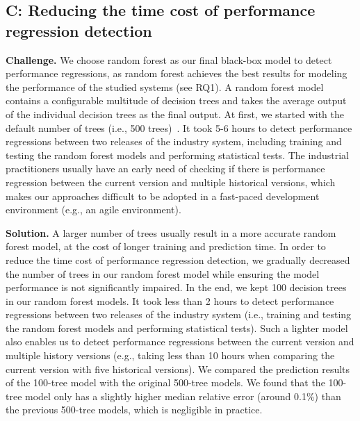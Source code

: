 \subsection*{C: Reducing the time cost of performance regression detection}
\noindent\textbf{Challenge.}
We choose random forest as our final black-box model to detect performance regressions, as random forest achieves the best results for modeling the performance of the studied systems (see RQ1).
A random forest model contains a configurable multitude of decision trees and takes the average output of the individual decision trees as the final output.
At first, we started with the default number of trees (i.e., 500 trees)~\citep{R-RandomForest}.
It took 5-6 hours to detect performance regressions between two releases of the industry system, including training and testing the random forest models and performing statistical tests. 
The industrial practitioners usually have an early need of checking if there is performance regression between the current version and multiple historical versions, which makes our approaches difficult to be adopted in a fast-paced development environment (e.g., an agile environment).

\noindent\textbf{Solution.}
A larger number of trees usually result in a more accurate random forest model, at the cost of longer training and prediction time.
In order to reduce the time cost of performance regression detection, we gradually decreased the number of trees in our random forest model while ensuring the model performance is not significantly impaired.
In the end, we kept 100 decision trees in our random forest models.
It took less than 2 hours to detect performance regressions between two releases of the industry system (i.e., training and testing the random forest models and performing statistical tests). 
Such a lighter model also enables us to detect performance regressions between the current version and multiple history versions (e.g., taking less than 10 hours when comparing the current version with five historical versions). 
We compared the prediction results of the 100-tree model with the original 500-tree models. We found that the 100-tree model only has a slightly higher median relative error (around 0.1\%) than the previous 500-tree models, which is negligible in practice.

